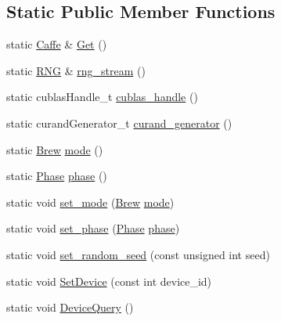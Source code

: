 \subsection*{Static Public Member Functions}
\begin{DoxyCompactItemize}
\item 
static \hyperlink{classcaffe_1_1_caffe}{Caffe} \& \hyperlink{classcaffe_1_1_caffe_a6a0a8e4ff537a038707f50f28f6ca65d}{Get} ()
\item 
static \hyperlink{classcaffe_1_1_caffe_1_1_r_n_g}{R\+N\+G} \& \hyperlink{classcaffe_1_1_caffe_aff31f4285d99f4254e2af4e40678bf5e}{rng\+\_\+stream} ()
\item 
static cublas\+Handle\+\_\+t \hyperlink{classcaffe_1_1_caffe_afbba8bb2af70b628eca89269b81c915f}{cublas\+\_\+handle} ()
\item 
static curand\+Generator\+\_\+t \hyperlink{classcaffe_1_1_caffe_a659f92f48f20d95c46c6629574a26c0f}{curand\+\_\+generator} ()
\item 
static \hyperlink{classcaffe_1_1_caffe_af8f607248c1f212be1f6f1c988d80e4e}{Brew} \hyperlink{classcaffe_1_1_caffe_aa45214769b727ecd971e0d5ed8ffe96a}{mode} ()
\item 
static \hyperlink{classcaffe_1_1_caffe_ad2993dccc4a615c39259ed7f0d0e24e9}{Phase} \hyperlink{classcaffe_1_1_caffe_aa2727a8d4f9290dd2a750590a9c0ad08}{phase} ()
\item 
static void \hyperlink{classcaffe_1_1_caffe_a025008ff5854ba15e62138c81b7a140d}{set\+\_\+mode} (\hyperlink{classcaffe_1_1_caffe_af8f607248c1f212be1f6f1c988d80e4e}{Brew} \hyperlink{classcaffe_1_1_caffe_aa45214769b727ecd971e0d5ed8ffe96a}{mode})
\item 
static void \hyperlink{classcaffe_1_1_caffe_ad1b7dfdc899fda430750adc24aca34f8}{set\+\_\+phase} (\hyperlink{classcaffe_1_1_caffe_ad2993dccc4a615c39259ed7f0d0e24e9}{Phase} \hyperlink{classcaffe_1_1_caffe_aa2727a8d4f9290dd2a750590a9c0ad08}{phase})
\item 
static void \hyperlink{classcaffe_1_1_caffe_a1f6f560b0f9f73a596284908ee44ecc7}{set\+\_\+random\+\_\+seed} (const unsigned int seed)
\item 
static void \hyperlink{classcaffe_1_1_caffe_ac95c04832bf528acb3ae8f1ffa5b6c11}{Set\+Device} (const int device\+\_\+id)
\item 
static void \hyperlink{classcaffe_1_1_caffe_a4af30f25dc929f2b9c1f195e1683a411}{Device\+Query} ()
\end{DoxyCompactItemize}
